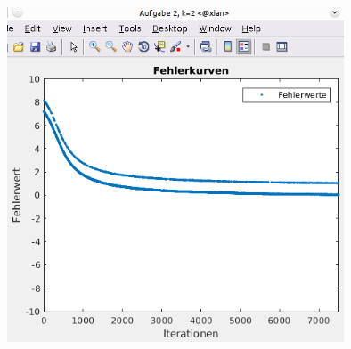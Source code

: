 \documentclass[12pt]{article}
\begin{document}
\begin{center}
\includegraphics[width=10cm]{Bilder/errorplot_aufg2_k2.png}
\end{center}
\end{document}
